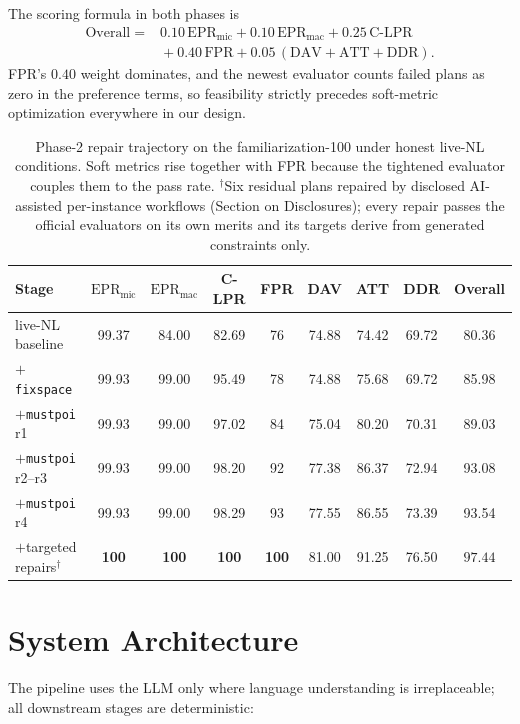 \documentclass{article}
\begin{document}
The scoring formula in both phases is
\begin{align*}
\mathrm{Overall} ={}& 0.10\,\mathrm{EPR_{mic}} + 0.10\,\mathrm{EPR_{mac}}
 + 0.25\,\mathrm{C\mbox{-}LPR}\\
 &{}+ 0.40\,\mathrm{FPR}
 + 0.05\,(\mathrm{DAV} + \mathrm{ATT} + \mathrm{DDR}).
\end{align*}
FPR's $0.40$ weight dominates, and the newest evaluator counts failed plans
as zero in the preference terms, so feasibility strictly precedes
soft-metric optimization everywhere in our design.

\begin{table}[t]
\centering
\small
\begin{tabular}{lcccccccc}
\toprule
Stage & $\mathrm{EPR_{mic}}$ & $\mathrm{EPR_{mac}}$ & C-LPR & FPR & DAV & ATT & DDR & Overall\\
\midrule
live-NL baseline           & 99.37 & 84.00 & 82.69 & 76 & 74.88 & 74.42 & 69.72 & 80.36\\
$+$\texttt{fixspace}       & 99.93 & 99.00 & 95.49 & 78 & 74.88 & 75.68 & 69.72 & 85.98\\
$+$\texttt{mustpoi} r1     & 99.93 & 99.00 & 97.02 & 84 & 75.04 & 80.20 & 70.31 & 89.03\\
$+$\texttt{mustpoi} r2--r3 & 99.93 & 99.00 & 98.20 & 92 & 77.38 & 86.37 & 72.94 & 93.08\\
$+$\texttt{mustpoi} r4     & 99.93 & 99.00 & 98.29 & 93 & 77.55 & 86.55 & 73.39 & 93.54\\
$+$targeted repairs$^\dagger$ & \textbf{100} & \textbf{100} & \textbf{100} & \textbf{100} & 81.00 & 91.25 & 76.50 & $\mathbf{97.44}$\\
\bottomrule
\end{tabular}
\caption{Phase-2 repair trajectory on the familiarization-100 under honest
live-NL conditions. Soft metrics rise together with FPR because the
tightened evaluator couples them to the pass rate. $^\dagger$Six residual
plans repaired by disclosed AI-assisted per-instance workflows (Section on
Disclosures); every repair passes the official evaluators on its own merits
and its targets derive from generated constraints only.}
\label{tab:trajectory}
\end{table}

\section{System Architecture}

The pipeline uses the LLM only where language understanding is
irreplaceable; all downstream stages are deterministic:
\end{document}
